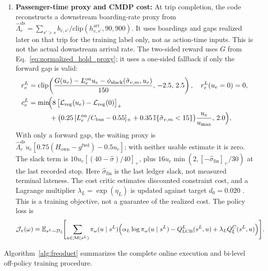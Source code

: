 \begin{enumerate}
  \item \textbf{Passenger-time proxy and CMDP cost:} At trip completion, the code reconstructs a downstream boarding-rate proxy from $\widehat{\Lambda}^{\mathrm{ds}}_e=\sum_{s'>s} b_{v,s'}/\mathrm{clip}(h^{\mathrm{arr}}_{v,s'},90,900)$. It uses boardings and gaps realized later on that trip for the training label only, not as action-time inputs. This is not the actual downstream arrival rate. The two-sided reward uses $G$ from Eq.~\eqref{eq:normalized_hold_proxy}; it uses a one-sided fallback if only the forward gap is valid:
  \begin{align}
    r^L_e &= \mathrm{clip}\!\left(\frac{G(u_e) - L^{\mathrm{on}}_e u_e - \phi_{\mathrm{slack}}(\hat{\sigma}_{v,m}, u_e)}{150},\, -2.5,\, 2.5\right), \quad r^L_e(u_e=0) = 0, \label{eq:lower_reward} \\
    c^L_e &= \min\!\Bigl(8\,\bigl[\mathcal{L}_{\mathrm{reg}}(u_e) - \mathcal{L}_{\mathrm{reg}}(0)\bigr]_+ \nonumber \\
          &\qquad\quad + \bigl(0.25\,[L^{\mathrm{on}}_e/C_{\mathrm{bus}} - 0.55]_+ + 0.35\,\mathbb{I}\{\hat{\sigma}_{v,m} < 15\}\bigr)\frac{u_e}{u_{\max}},\, 2.0\Bigr), \label{eq:lower_cost}
  \end{align}
  With only a forward gap, the waiting proxy is $\widehat{\Lambda}^{\mathrm{ds}}_e u_e[0.75(H_{\mathrm{own}}-g^{\mathrm{fwd}})-0.5u_e]$; with neither usable estimate it is zero. The slack term is $10u_e[(40-\hat\sigma)/40]_+$, plus $16u_e\min(2,[-\hat\sigma_{\mathrm{fin}}]_+/30)$ at the last recorded stop. Here $\hat\sigma_{\mathrm{fin}}$ is the last ledger slack, not measured terminal lateness. The cost critic estimates discounted constraint cost, and a Lagrange multiplier $\lambda_L=\exp(\eta_L)$ is updated against target $d_0=0.020$ \citep{altman1999constrained,stooke2020responsive}. This is a training objective, not a guarantee of the realized cost. The policy loss is
  \begin{equation}
    \mathcal{J}_\pi(\omega) = \mathbb{E}_{s^L \sim \mathcal{D}_L}\!\Biggl[\sum_{u \in \mathcal{M}(s^L)} \pi_\omega(u \mid s^L)\Bigl(\alpha_L \log \pi_\omega(u \mid s^L) - Q^L_{\mathrm{LCB}}(s^L, u) + \lambda_L Q^C_\xi(s^L, u)\Bigr)\Biggr].
    \label{eq:lower_actor_loss}
  \end{equation}
\end{enumerate}

Algorithm~\ref{alg:freqduet} summarizes the complete online execution and bi-level off-policy training procedure.

